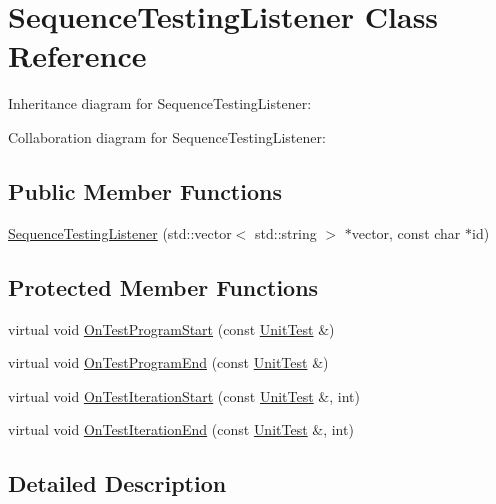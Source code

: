 \hypertarget{class_sequence_testing_listener}{}\section{Sequence\+Testing\+Listener Class Reference}
\label{class_sequence_testing_listener}


Inheritance diagram for Sequence\+Testing\+Listener\+:


Collaboration diagram for Sequence\+Testing\+Listener\+:
\subsection*{Public Member Functions}
\begin{DoxyCompactItemize}
\item 
\hyperlink{class_sequence_testing_listener_ac0fcb350d20876f8273621ad4c79ba7a}{Sequence\+Testing\+Listener} (std\+::vector$<$ std\+::string $>$ $\ast$vector, const char $\ast$id)
\end{DoxyCompactItemize}
\subsection*{Protected Member Functions}
\begin{DoxyCompactItemize}
\item 
virtual void \hyperlink{class_sequence_testing_listener_a25b96acdbaa6f582e583e6b56bd39b42}{On\+Test\+Program\+Start} (const \hyperlink{classtesting_1_1_unit_test}{Unit\+Test} \&)
\item 
virtual void \hyperlink{class_sequence_testing_listener_aacac5e15bac089460841ff63a5c31f57}{On\+Test\+Program\+End} (const \hyperlink{classtesting_1_1_unit_test}{Unit\+Test} \&)
\item 
virtual void \hyperlink{class_sequence_testing_listener_a345641262fa10cc4b251ac54116db74b}{On\+Test\+Iteration\+Start} (const \hyperlink{classtesting_1_1_unit_test}{Unit\+Test} \&, int)
\item 
virtual void \hyperlink{class_sequence_testing_listener_a783bc01e2a95f5bf73bbde4d96832e0f}{On\+Test\+Iteration\+End} (const \hyperlink{classtesting_1_1_unit_test}{Unit\+Test} \&, int)
\end{DoxyCompactItemize}


\subsection{Detailed Description}


